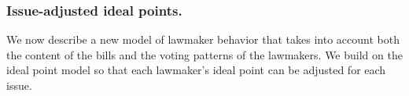 



\subsubsection{Issue-adjusted ideal points.}



We now describe a new model of lawmaker behavior that takes into
account both the content of the bills and the voting patterns of the
lawmakers.  We build on the ideal point model so that
each lawmaker's ideal point can be adjusted for each issue.

